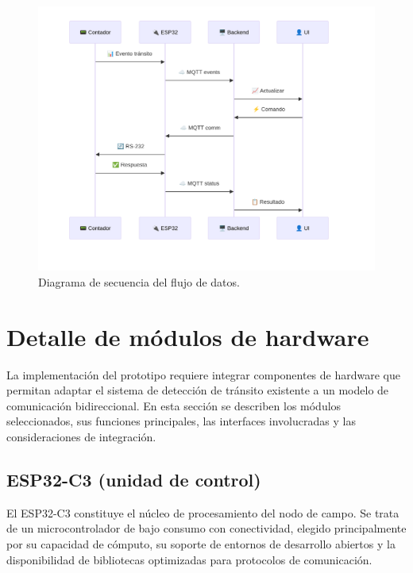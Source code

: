 \begin{figure}[H]
  \centering
  \includegraphics[width=1.15\linewidth]{./Figures/diagSecuencia.png}
  \caption{Diagrama de secuencia del flujo de datos.}
  \label{fig:diag_secuencia}
\end{figure}






\section{Detalle de módulos de hardware}
La implementación del prototipo requiere integrar componentes de hardware que permitan adaptar el sistema de detección de tránsito existente a un modelo de comunicación bidireccional. En esta sección se describen los módulos seleccionados, sus funciones principales, las interfaces involucradas y las consideraciones de integración.


\subsection{ESP32-C3 (unidad de control)}
El ESP32-C3 constituye el núcleo de procesamiento del nodo de campo. Se trata de un microcontrolador de bajo consumo con conectividad, elegido principalmente por su capacidad de cómputo, su soporte de entornos de desarrollo abiertos y la disponibilidad de bibliotecas optimizadas para protocolos de comunicación.

